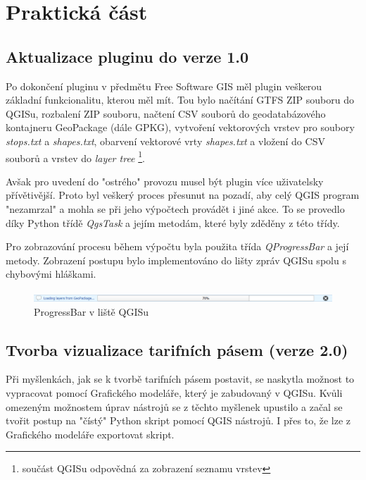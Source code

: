 \chapter{Praktická část}
\label{5-postup}

\section{Aktualizace pluginu do verze 1.0}
Po dokončení pluginu v předmětu Free Software GIS měl plugin veškerou základní 
funkcionalitu, kterou měl mít. Tou bylo načítání GTFS ZIP souboru do QGISu,
rozbalení ZIP souboru, načtení CSV souborů do geodatabázového kontajneru GeoPackage (dále GPKG),
vytvoření vektorových vrstev pro soubory \textit{stops.txt} a \textit{shapes.txt},
obarvení vektorové vrty \textit{shapes.txt} a vložení do CSV souborů a vrstev do
\textit{layer tree} \footnote{součást QGISu odpovědná za zobrazení seznamu vrstev}.

Avšak pro uvedení do "ostrého" provozu musel být plugin více uživatelsky přívětivější.
Proto byl veškerý proces přesunut na pozadí, aby celý QGIS program "nezamrzal" a
mohla se při jeho výpočtech provádět i jiné akce. To se provedlo díky Python třídě \textit{QgsTask}
a jejím metodám, které byly zděděny z této třídy. \cite{QgsTask}

Pro zobrazování procesu během výpočtu byla použita třída \textit{QProgressBar} a její metody.
Zobrazení postupu bylo implementováno do lišty zpráv QGISu spolu s chybovými hláškami.

\begin{figure}[H] \centering
    \includegraphics[width=400pt]{./pictures/loading.png}
    \caption[ProgressBar]{ProgressBar v liště QGISu}
	\label{fig:ProgressBar v liště QGISu}              
\end{figure}     


\section{Tvorba vizualizace tarifních pásem (verze 2.0)}

Při myšlenkách, jak se k tvorbě tarifních pásem postavit,
se naskytla možnost to vypracovat pomocí Grafického modeláře, který je zabudovaný v QGISu. 
Kvůli omezeným možnostem úprav nástrojů se z těchto myšlenek upustilo a začal se tvořit postup
na "čístý" Python skript pomocí QGIS nástrojů. I přes to, že lze z Grafického modeláře exportovat skript. 

